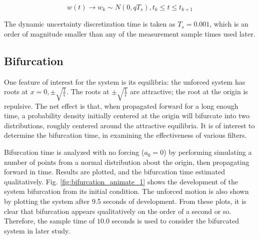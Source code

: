 \documentclass[]{article}
\begin{document}
\begin{equation}
w(t) \rightarrow w_k \sim N(0,qT_s), t_k \leq t \leq t_{k+1}
\end{equation}

The dynamic uncertainty discretization time is taken as $T_s = 0.001$, which is an order of magnitude smaller than any of the measurement sample times used later.

\subsection{Bifurcation}

One feature of interest for the system is its equilibria: the unforced system has roots at $x = 0, \pm \sqrt{\frac{1}{\epsilon}}$. The roots at $\pm \sqrt{\frac{1}{\epsilon}}$ are attractive; the root at the origin is repulsive. The net effect is that, when propagated forward for a long enough time, a probability density initially centered at the origin will bifurcate into two distributions, roughly centered around the attractive equilibria. It is of interest to determine the bifurcation time, in examining the effectiveness of various filters.

Bifurcation time is analyzed with no forcing ($a_0 = 0$) by performing simulating a number of points from a normal distribution about the origin, then propagating forward in time. Results are plotted, and the bifurcation time estimated qualitatively. Fig. \ref{fig:bifurcation_animate_1} shows the development of the system bifurcation from its initial condition. The unforced motion is also shown by plotting the system after 9.5 seconds of development. From these plots, it is clear that bifurcation appears qualitatively on the order of a second or so. Therefore, the sample time of $10.0$ seconds is used to consider the bifurcated system in later study.
\end{document}
